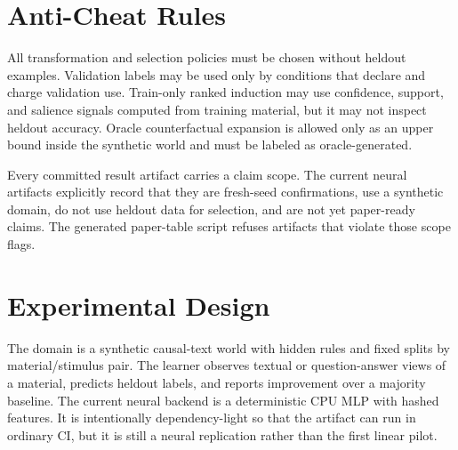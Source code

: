 \documentclass[11pt]{article}
\begin{document}
\section{Anti-Cheat Rules}

All transformation and selection policies must be chosen without heldout
examples. Validation labels may be used only by conditions that declare and
charge validation use. Train-only ranked induction may use confidence, support,
and salience signals computed from training material, but it may not inspect
heldout accuracy. Oracle counterfactual expansion is allowed only as an upper
bound inside the synthetic world and must be labeled as oracle-generated.

Every committed result artifact carries a claim scope. The current neural
artifacts explicitly record that they are fresh-seed confirmations, use a
synthetic domain, do not use heldout data for selection, and are not yet
paper-ready claims. The generated paper-table script refuses artifacts that
violate those scope flags.

\section{Experimental Design}

The domain is a synthetic causal-text world with hidden rules and fixed splits
by material/stimulus pair. The learner observes textual or question-answer
views of a material, predicts heldout labels, and reports improvement over a
majority baseline. The current neural backend is a deterministic CPU MLP with
hashed features. It is intentionally dependency-light so that the artifact can
run in ordinary CI, but it is still a neural replication rather than the first
linear pilot.
\end{document}
